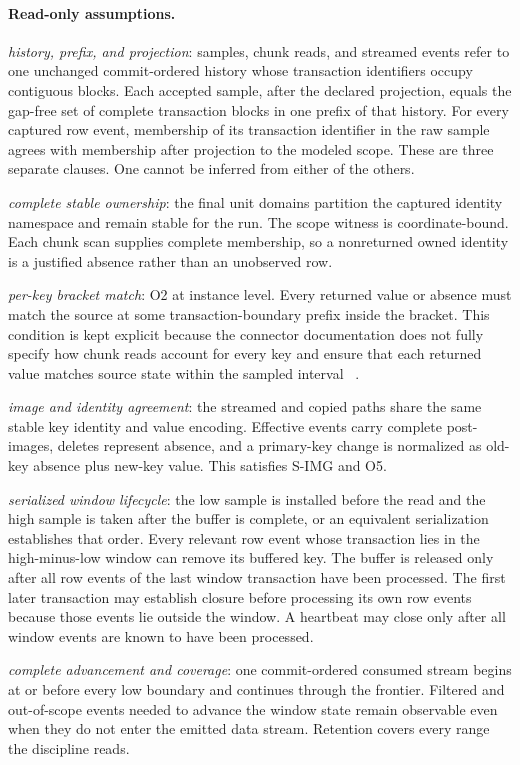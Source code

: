 \documentclass[sigconf,nonacm,10pt]{acmart}
\theoremstyle{plain}
\theoremstyle{definition}
\begin{document}
\paragraph{Read-only assumptions.}
\begin{description}
\RaggedRight
\item[\textbf{A-linear}] \emph{history, prefix, and projection}:
samples, chunk reads, and streamed events refer to one unchanged
commit-ordered history whose transaction identifiers occupy contiguous
blocks. Each accepted sample, after the declared projection, equals the
gap-free set of complete transaction blocks in one prefix of that
history. For every captured row event, membership of its transaction
identifier in the raw sample agrees with membership after projection to
the modeled scope. These are three separate clauses. One cannot be
inferred from either of the others.
\item[\textbf{A-scope}] \emph{complete stable ownership}: the final
unit domains partition the captured identity namespace and remain
stable for the run. The scope witness is coordinate-bound. Each chunk
scan supplies complete membership, so a nonreturned owned identity is
a justified absence rather than an unobserved row.
\item[\textbf{A-read}] \emph{per-key bracket match}: O2 at
instance level. Every returned value or absence must match the source
at some transaction-boundary prefix inside the bracket. This condition 
is kept explicit because the connector documentation does not fully
specify how chunk reads account for every key and ensure that each
returned value matches source state within the sampled interval
~\cite{debezium_mysql_connector,debezium_mariadb_connector}.
\item[\textbf{A-representation}] \emph{image and identity
agreement}: the streamed and copied paths share the same stable key
identity and value encoding. Effective events carry complete
post-images, deletes represent absence, and a primary-key change is
normalized as old-key absence plus new-key value. This satisfies
S-IMG and O5.
\item[\textbf{A-discard}] \emph{serialized window lifecycle}: the low
sample is installed before the read and the high sample is taken after
the buffer is complete, or an equivalent serialization establishes
that order. Every relevant row event whose transaction lies in the
high-minus-low window can remove its buffered key. The buffer is
released only after all row events of the last window transaction have
been processed. The first later transaction may establish closure
before processing its own row events because those events lie outside
the window. A heartbeat may close only after all window events are
known to have been processed.
\item[\textbf{S-OBS}] \emph{complete advancement and coverage}: one
commit-ordered consumed stream begins at or before every low boundary
and continues through the frontier. Filtered and out-of-scope events
needed to advance the window state remain observable even when they
do not enter the emitted data stream. Retention covers every range the
discipline reads.
\end{description}
\end{document}
